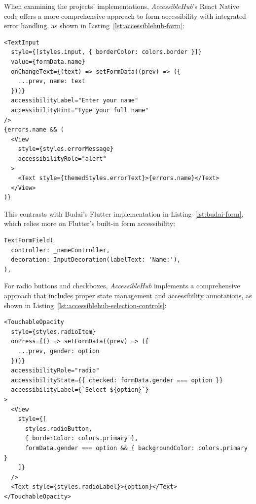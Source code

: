 {\pagebreak

When examining the projects' implementations, \textit{AccessibleHub}'s React Native code offers a more comprehensive approach to form accessibility with integrated error handling, as shown in Listing~\ref{lst:accessiblehub-form}:

\begin{lstlisting}[style=ReactNativeStyle, caption=Form implementation in \textit{AccessibleHub}'s React Native code, label=lst:accessiblehub-form]
<TextInput
  style={[styles.input, { borderColor: colors.border }]}
  value={formData.name}
  onChangeText={(text) => setFormData((prev) => ({
    ...prev, name: text
  }))}
  accessibilityLabel="Enter your name"
  accessibilityHint="Type your full name"
/>
{errors.name && (
  <View 
    style={styles.errorMessage} 
    accessibilityRole="alert"
  >
    <Text style={themedStyles.errorText}>{errors.name}</Text>
  </View>
)}
\end{lstlisting}

\pagebreak

This contrasts with Budai's Flutter implementation in Listing~\ref{lst:budai-form}, which relies more on Flutter's built-in form accessibility:

\begin{lstlisting}[style=DartStyle, caption=Form implementation in Budai's Flutter code, label=lst:budai-form]
TextFormField(
  controller: _nameController,
  decoration: InputDecoration(labelText: 'Name:'),
),
\end{lstlisting}

For radio buttons and checkboxes, \textit{AccessibleHub} implements a comprehensive approach that includes proper state management and accessibility annotations, as shown in Listing~\ref{lst:accessiblehub-selection-controls}:

\begin{lstlisting}[style=ReactNativeStyle, caption=Selection controls in \textit{AccessibleHub}, label=lst:accessiblehub-selection-controls]
<TouchableOpacity
  style={styles.radioItem}
  onPress={() => setFormData((prev) => ({ 
    ...prev, gender: option 
  }))}
  accessibilityRole="radio"
  accessibilityState={{ checked: formData.gender === option }}
  accessibilityLabel={`Select ${option}`}
>
  <View
    style={[
      styles.radioButton,
      { borderColor: colors.primary },
      formData.gender === option && { backgroundColor: colors.primary }
    ]}
  />
  <Text style={styles.radioLabel}>{option}</Text>
</TouchableOpacity>
\end{lstlisting}

}
